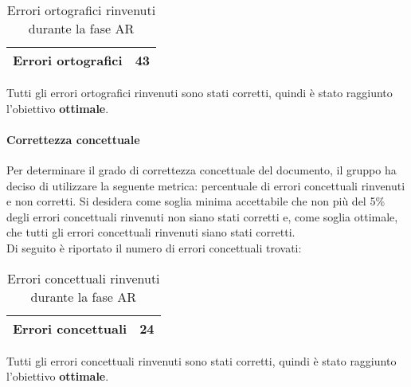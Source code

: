 \documentclass[PianoDiQualifica.tex]{subfiles}
\begin{document}
				\begin{table}[h]
				\centering
				\begin{tabular}{l c}
					\hline
					\rule[0cm]{0cm}{0.4cm}
					Errori ortografici & 43 \\
					\hline
				\end{tabular}
				\caption{Errori ortografici rinvenuti durante la fase AR}
			\end{table}		
			
			Tutti gli errori ortografici rinvenuti sono stati corretti, quindi è stato
raggiunto l’obiettivo \textbf{ottimale}.
				
				
		\paragraph{Correttezza concettuale}
		Per determinare il grado di correttezza concettuale del documento, il gruppo ha deciso di utilizzare la seguente metrica: percentuale di errori concettuali rinvenuti e non corretti.
				Si desidera come soglia minima accettabile che non più del 5\% degli errori concettuali rinvenuti non siano stati corretti e, come soglia ottimale, che tutti gli errori
				concettuali rinvenuti siano stati corretti.\\
				Di seguito è riportato il numero di errori concettuali trovati:\\
				
				\begin{table}[h]
				\centering
				\begin{tabular}{l c}
					\hline
					\rule[0cm]{0cm}{0.4cm}
					Errori concettuali & 24 \\
					\hline
				\end{tabular}
				\caption{Errori concettuali rinvenuti durante la fase AR}
			\end{table}	
			
			Tutti gli errori concettuali rinvenuti sono stati corretti, quindi è stato
raggiunto l’obiettivo \textbf{ottimale}.
\end{document}
